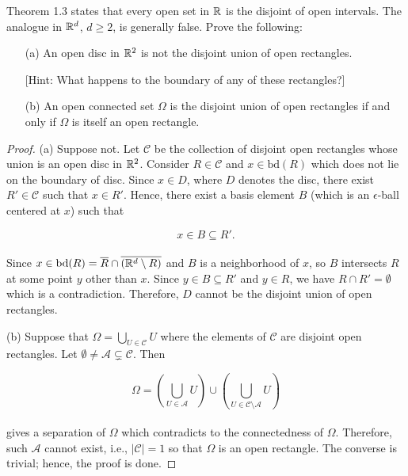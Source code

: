 \documentclass[12pt, a4paper, openany, twoside]{book}
\theoremstyle{definition}
\theoremstyle{remark}
\newcommand{\ov}{\overline}
\theoremstyle{plain}
\numberwithin{equation}{section}
\begin{document}
\begin{tcolorbox}[colback=yellow!10!white,colframe=gray!75!black,title=Exercise 1.12]\label{Exercise 1.12} 
    Theorem 1.3 states that every open set in ${\mathbb {R}}$ is the disjoint of open intervals. The analogue in ${\mathbb {R}}^d$, $d\geq 2$, is generally false. Prove the following:
    \begin{enumerate}
        \item [(a)] An open disc in ${\mathbb {R}}^2$ is not the disjoint union of open rectangles.
        
        [Hint: What happens to the boundary of any of these rectangles?]
        \item [(b)] An open connected set $\Omega$ is the disjoint union of open rectangles if and only if $\Omega$ is itself an open rectangle.
    \end{enumerate}
\end{tcolorbox}
\begin{proof}
    (a) Suppose not. Let $\mathcal{C}$ be the collection of disjoint open rectangles whose union is an open disc in ${\mathbb {R}}^2$. Consider $R\in\mathcal{C}$ and $x\in\mathrm{bd}(R)$ which does not lie on the boundary of disc. Since $x\in D$, where $D$ denotes the disc, there exist $R'\in\mathcal{C}$ such that $x\in R'$. Hence, there exist a basis element $B$ (which is an $\epsilon$-ball centered at $x$) such that

    \[x\in B\subseteq R'.\]
    \\
    Since $x\in\mathrm{bd}(R)=\ov{R}\cap\ov{(\BR^d\setminus R)}$ and $B$ is a neighborhood of $x$, so $B$ intersects $R$ at some point $y$ other than $x$. Since $y\in B\subseteq R'$ and $y\in R$, we have $R\cap R'=\emptyset$ which is a contradiction. Therefore, $D$ cannot be the disjoint union of open rectangles.

    \vspace{5mm}
    (b) Suppose that $\Omega=\bigcup_{U\in\mathcal{C}}{U}$ where the elements of $\mathcal{C}$ are disjoint open rectangles. Let $\emptyset\neq\mathcal{A}\subsetneq\mathcal{C}$. Then 

    \[\Omega=\left(\bigcup_{U\in\mathcal{A}}{U}\right)\cup\left(\bigcup_{U\in\mathcal{C}\setminus\mathcal{A}}{U}\right)\]
    \\
    gives a separation of $\Omega$ which contradicts to the connectedness of $\Omega$. Therefore, such $\mathcal{A}$ cannot exist, i.e., $|\mathcal{C}|=1$ so that $\Omega$ is an open rectangle.
    The converse is trivial; hence, the proof is done.
\end{proof}
\end{document}
